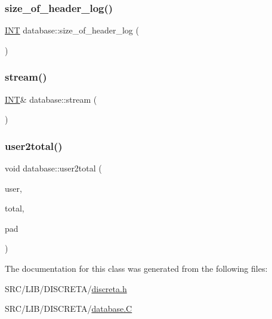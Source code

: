 \mbox{\label{classdatabase_a2ed2d1231bc36e5267f6a8bac422738d}} 
\subsubsection{\texorpdfstring{size\+\_\+of\+\_\+header\+\_\+log()}{size\_of\_header\_log()}}
{\footnotesize\ttfamily \mbox{\hyperlink{galois_8h_a09fddde158a3a20bd2dcadb609de11dc}{I\+NT}} database\+::size\+\_\+of\+\_\+header\+\_\+log (\begin{DoxyParamCaption}{ }\end{DoxyParamCaption})}

\mbox{\label{classdatabase_a8b91f87e7cd92b8207cbc48edde9d69e}} 
\subsubsection{\texorpdfstring{stream()}{stream()}}
{\footnotesize\ttfamily \mbox{\hyperlink{galois_8h_a09fddde158a3a20bd2dcadb609de11dc}{I\+NT}}\& database\+::stream (\begin{DoxyParamCaption}{ }\end{DoxyParamCaption})\hspace{0.3cm}{\ttfamily [inline]}}

\mbox{\label{classdatabase_ae87e9d8c044500276c16176b46fbf906}} 
\subsubsection{\texorpdfstring{user2total()}{user2total()}}
{\footnotesize\ttfamily void database\+::user2total (\begin{DoxyParamCaption}\item[{\mbox{\hyperlink{galois_8h_a09fddde158a3a20bd2dcadb609de11dc}{I\+NT}}}]{user,  }\item[{\mbox{\hyperlink{galois_8h_a09fddde158a3a20bd2dcadb609de11dc}{I\+NT}} $\ast$}]{total,  }\item[{\mbox{\hyperlink{galois_8h_a09fddde158a3a20bd2dcadb609de11dc}{I\+NT}} $\ast$}]{pad }\end{DoxyParamCaption})}



The documentation for this class was generated from the following files\+:\begin{DoxyCompactItemize}
\item 
S\+R\+C/\+L\+I\+B/\+D\+I\+S\+C\+R\+E\+T\+A/\mbox{\hyperlink{discreta_8h}{discreta.\+h}}\item 
S\+R\+C/\+L\+I\+B/\+D\+I\+S\+C\+R\+E\+T\+A/\mbox{\hyperlink{database_8_c}{database.\+C}}\end{DoxyCompactItemize}
